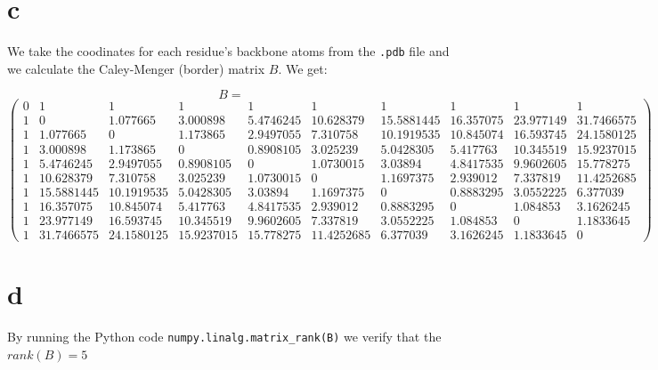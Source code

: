 \documentclass[a4paper,11pt]{article}
\begin{document}
\section*{c}

We take the coodinates for each residue's backbone atoms from the \verb|.pdb| file and we calculate the Caley-Menger (border) matrix $B$. We get:

\begin{small}
  \[B =\]
  \[\begin{pmatrix}
    0 & 1 & 1 & 1 & 1 & 1 & 1 & 1 & 1 & 1\\
    1 & 0 & 1.077665 & 3.000898 & 5.4746245 & 10.628379 & 15.5881445 & 16.357075 & 23.977149 & 31.7466575\\
    1 & 1.077665 & 0 & 1.173865 & 2.9497055 & 7.310758 & 10.1919535 & 10.845074 & 16.593745  & 24.1580125\\
    1 & 3.000898 & 1.173865 & 0 & 0.8908105 & 3.025239 & 5.0428305 & 5.417763 & 10.345519  & 15.9237015\\
    1 & 5.4746245 & 2.9497055 & 0.8908105 & 0 & 1.0730015 & 3.03894 & 4.8417535 & 9.9602605 & 15.778275\\
    1 & 10.628379 & 7.310758 & 3.025239 & 1.0730015 & 0 & 1.1697375 & 2.939012 & 7.337819 & 11.4252685\\
    1 & 15.5881445 & 10.1919535 & 5.0428305 & 3.03894 & 1.1697375 & 0 & 0.8883295 & 3.0552225 & 6.377039\\
    1 & 16.357075 & 10.845074 & 5.417763 & 4.8417535 & 2.939012 & 0.8883295 & 0 & 1.084853 & 3.1626245\\
    1 & 23.977149 & 16.593745 & 10.345519 & 9.9602605 & 7.337819 & 3.0552225 & 1.084853 & 0 & 1.1833645\\
    1 & 31.7466575 & 24.1580125 & 15.9237015 & 15.778275 & 11.4252685 & 6.377039 & 3.1626245 & 1.1833645 & 0
  \end{pmatrix}\]
\end{small}

\section*{d}

By running the Python code \verb|numpy.linalg.matrix_rank(B)| we verify that the $rank(B) = 5$
\end{document}
